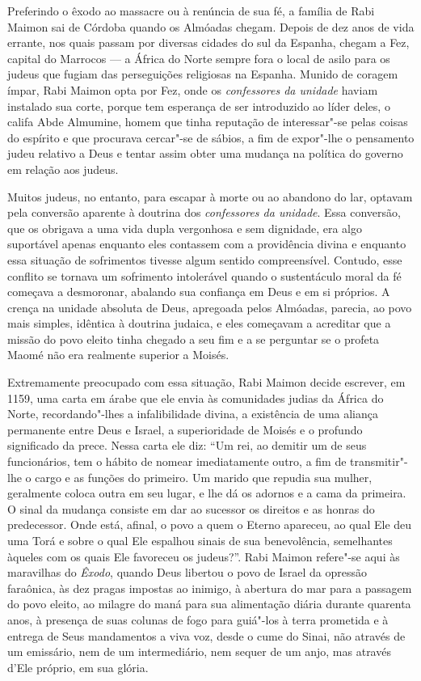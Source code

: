 Preferindo o êxodo ao massacre ou à renúncia de sua fé, a família de
Rabi Maimon sai de Córdoba quando os Almóadas chegam. Depois de dez
anos de vida errante, nos quais passam por diversas cidades do sul da
Espanha, chegam a Fez, capital do Marrocos --- a África do Norte
sempre fora o local de asilo para os judeus que fugiam das perseguições
religiosas na Espanha. Munido de coragem ímpar, Rabi Maimon opta por
Fez, onde os \emph{confessores da unidade} haviam instalado sua corte,
porque tem esperança de ser introduzido ao líder deles, o califa
Abde Almumine, homem que tinha reputação de interessar"-se pelas coisas 
do espírito e que procurava cercar"-se de sábios, a fim de expor"-lhe o 
pensamento judeu relativo a Deus e tentar assim obter uma mudança na 
política do governo em relação aos judeus.

Muitos judeus, no entanto, para escapar à morte ou ao abandono do lar,
optavam pela conversão aparente à doutrina dos \emph{confessores da
unidade}. Essa conversão, que os obrigava a uma vida dupla vergonhosa
e sem dignidade, era algo suportável apenas enquanto eles contassem com
a providência divina e enquanto essa situação de sofrimentos tivesse
algum sentido compreensível. Contudo, esse conflito se tornava um
sofrimento intolerável quando o sustentáculo moral da fé começava a
desmoronar, abalando sua confiança em Deus e em si próprios. A crença na
unidade absoluta de Deus, apregoada pelos Almóadas, parecia, ao povo
mais simples, idêntica à doutrina judaica, e eles começavam a acreditar
que a missão do povo eleito tinha chegado a seu fim e a se perguntar se
o profeta Maomé não era realmente superior a Moisés.

Extremamente preocupado com essa situação, Rabi Maimon decide escrever,
em 1159, uma carta em árabe que ele envia às comunidades judias da
África do Norte, recordando"-lhes a infalibilidade divina, a existência
de uma aliança permanente entre Deus e Israel, a superioridade de Moisés
e o profundo significado da prece. Nessa carta ele diz: ``Um rei, ao
demitir um de seus funcionários, tem o hábito de nomear imediatamente
outro, a fim de transmitir"-lhe o cargo e as funções do primeiro. Um
marido que repudia sua mulher, geralmente coloca outra em seu lugar, e
lhe dá os adornos e a cama da primeira. O sinal da mudança consiste em
dar ao sucessor os direitos e as honras do predecessor. Onde está,
afinal, o povo a quem o Eterno apareceu, ao qual Ele deu uma
Torá e sobre o qual Ele espalhou sinais de sua benevolência,
semelhantes àqueles com os quais Ele favoreceu os judeus?''. Rabi
Maimon refere"-se aqui às maravilhas do \emph{Êxodo}, quando Deus libertou o
povo de Israel da opressão faraônica, às dez pragas impostas ao inimigo,
à abertura do mar para a passagem do povo eleito, ao milagre do maná
para sua alimentação diária durante quarenta anos, à presença de suas
colunas de fogo para guiá"-los à terra prometida e à entrega de Seus
mandamentos a viva voz, desde o cume do Sinai, não através de um
emissário, nem de um intermediário, nem sequer de um anjo, mas através
d'Ele próprio, em sua glória. 


